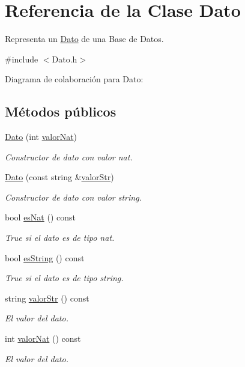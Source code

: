 \hypertarget{classDato}{}\section{Referencia de la Clase Dato}
\label{classDato}


Representa un \mbox{\hyperlink{classDato}{Dato}} de una Base de Datos.  




{\ttfamily \#include $<$Dato.\+h$>$}



Diagrama de colaboración para Dato\+:
\subsection*{Métodos públicos}
\begin{DoxyCompactItemize}
\item 
\mbox{\hyperlink{classDato_aeb115751623b17f5cc61199c45dd6fb4}{Dato}} (int \mbox{\hyperlink{classDato_a77c0d9e6acfa7b69d3a7afbe6c24066b}{valor\+Nat}})
\begin{DoxyCompactList}\small\item\em Constructor de dato con valor nat. \end{DoxyCompactList}\item 
\mbox{\hyperlink{classDato_a3b8e8b3472eee6374487378e865e3428}{Dato}} (const string \&\mbox{\hyperlink{classDato_aeba738995483557ab6bdd9b677f6da63}{valor\+Str}})
\begin{DoxyCompactList}\small\item\em Constructor de dato con valor string. \end{DoxyCompactList}\item 
bool \mbox{\hyperlink{classDato_ac249a298a8ebc465af56bfc816ed03f4}{es\+Nat}} () const
\begin{DoxyCompactList}\small\item\em True si el dato es de tipo nat. \end{DoxyCompactList}\item 
bool \mbox{\hyperlink{classDato_a068bb78e76cf0a1388d9bdec4e509355}{es\+String}} () const
\begin{DoxyCompactList}\small\item\em True si el dato es de tipo string. \end{DoxyCompactList}\item 
string \mbox{\hyperlink{classDato_aeba738995483557ab6bdd9b677f6da63}{valor\+Str}} () const
\begin{DoxyCompactList}\small\item\em El valor del dato. \end{DoxyCompactList}\item 
int \mbox{\hyperlink{classDato_a77c0d9e6acfa7b69d3a7afbe6c24066b}{valor\+Nat}} () const
\begin{DoxyCompactList}\small\item\em El valor del dato. \end{DoxyCompactList}\end{DoxyCompactItemize}

